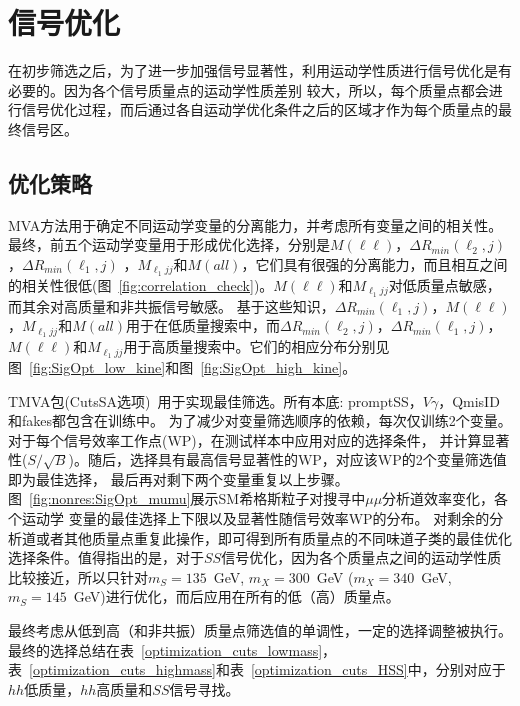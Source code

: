 \section{信号优化}\label{sec:signal_optimization}
在初步筛选之后，为了进一步加强信号显著性，利用运动学性质进行信号优化是有必要的。因为各个信号质量点的运动学性质差别
较大，所以，每个质量点都会进行信号优化过程，而后通过各自运动学优化条件之后的区域才作为每个质量点的最终信号区。

\subsection{优化策略}
MVA方法用于确定不同运动学变量的分离能力，并考虑所有变量之间的相关性。最终，前五个运动学变量用于形成优化选择，分别是$M(\ell\ell)$，$\Delta R_{min}(\ell_{2}, j)$，$\Delta R_{min}(\ell_{1}, j)$ ，$ M_{\ell_{1} jj}$和$M(all)$，它们具有很强的分离能力，而且相互之间的相关性很低(图~\ref{fig:correlation_check})。$M(\ell\ell)$和$ M_{\ell_{1} jj} $对低质量点敏感，而其余对高质量和非共振信号敏感。
基于这些知识，$\Delta R_{min}(\ell_{1}, j)$，$M(\ell\ell)$，$ M_{\ell_{1}jj}$和$M(all)$用于在低质量搜索中，而$\Delta R_{min}(\ell_{2}, j)$，$\Delta R_{min}(\ell_{1}, j)$，$M(\ell\ell)$和$M_{\ell_{1}jj}$用于高质量搜索中。它们的相应分布分别见图~\ref{fig:SigOpt_low_kine}和图~\ref{fig:SigOpt_high_kine}。

TMVA包(CutsSA选项)~\cite{Hocker:2007ht}用于实现最佳筛选。所有本底: promptSS，$V\gamma$，QmisID和fakes都包含在训练中。
为了减少对变量筛选顺序的依赖，每次仅训练2个变量。
对于每个信号效率工作点(WP)，在测试样本中应用对应的选择条件，
并计算显著性($S/\sqrt{B}$)。随后，选择具有最高信号显著性的WP，对应该WP的2个变量筛选值即为最佳选择，
最后再对剩下两个变量重复以上步骤。图~\ref{fig:nonres:SigOpt_mumu}展示SM希格斯粒子对搜寻中$\mu\mu$分析道效率变化，各个运动学
变量的最佳选择上下限以及显著性随信号效率WP的分布。
对剩余的分析道或者其他质量点重复此操作，即可得到所有质量点的不同味道子类的最佳优化选择条件。值得指出的是，对于$SS$信号优化，因为各个质量点之间的运动学性质比较接近，所以只针对$m_S=135$~GeV, $m_X=300$~GeV ($m_X=340$~GeV, $m_S=145$~GeV)进行优化，而后应用在所有的低（高）质量点。 

最终考虑从低到高（和非共振）质量点筛选值的单调性，一定的选择调整被执行。最终的选择总结在表~\ref{optimization_cuts_lowmass}，表~\ref {optimization_cuts_highmass}和表~\ref{optimization_cuts_HSS}中，分别对应于$hh$低质量，$hh$高质量和$SS$信号寻找。

